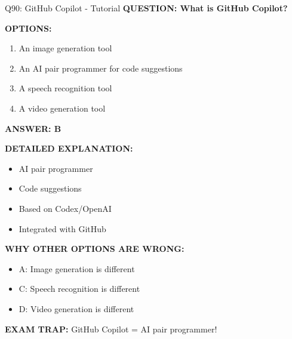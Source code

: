 \documentclass[8pt]{beamer}
\begin{document}
	\begin{frame}{Q90: GitHub Copilot - Tutorial}
		\fontsize{6.5}{7.5}\selectfont
		\textbf{QUESTION: What is GitHub Copilot?}
		
		\vspace{0.1cm}
		\textbf{OPTIONS:}
		\begin{enumerate}
			\item An image generation tool
			\item An AI pair programmer for code suggestions
			\item A speech recognition tool
			\item A video generation tool
		\end{enumerate}
		
		\vspace{0.1cm}
		\textcolor{myblue}{\textbf{ANSWER: B}}
		
		\vspace{0.1cm}
		\textbf{DETAILED EXPLANATION:}
		\begin{itemize}
			\item AI pair programmer
			\item Code suggestions
			\item Based on Codex/OpenAI
			\item Integrated with GitHub
		\end{itemize}
		
		\vspace{0.1cm}
		\textcolor{myred}{\textbf{WHY OTHER OPTIONS ARE WRONG:}}
		\begin{itemize}
			\item \textcolor{myred}{A:} Image generation is different
			\item \textcolor{myred}{C:} Speech recognition is different
			\item \textcolor{myred}{D:} Video generation is different
		\end{itemize}
		
		\textcolor{myred}{\textbf{EXAM TRAP:}} GitHub Copilot = \textcolor{myblue}{AI pair programmer}!
	\end{frame}
	
\end{document}
